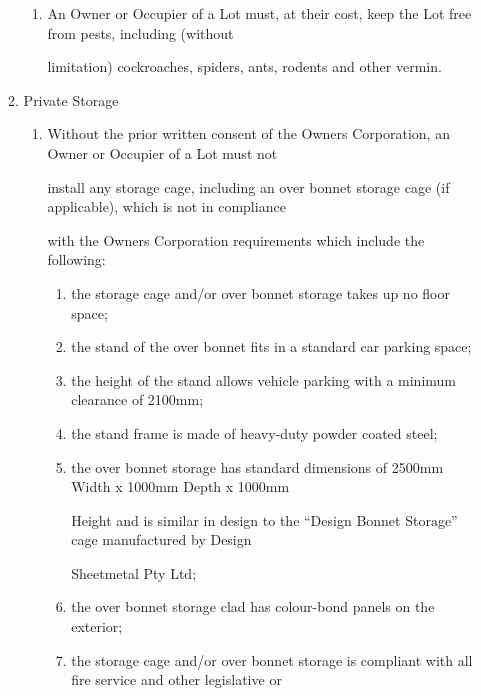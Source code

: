 \documentclass{article}
\begin{document}
\begin{enumerate}[label=\arabic*.]
\begin{enumerate}[label=\arabic{enumi}.\arabic*.]
\begin{enumerate}[label=(\arabic*)]
\item {\fontsize{9.962}{1} An Owner or Occupier of a Lot must, at their cost, keep the Lot free from pests, including (without }

{\fontsize{10.02}{1}limitation) cockroaches, spiders, ants, rodents and other vermin. }

\end{enumerate}
\item {\fontsize{9.99}{1} Private Storage }

\begin{enumerate}[label=(\arabic*)]
\item {\fontsize{9.962}{1} Without the prior written consent of the Owners Corporation, an Owner or Occupier of a Lot must not }

{\fontsize{10.02}{1}install any storage cage, including an over bonnet storage cage (if applicable), which is not in compliance }

{\fontsize{10.02}{1}with the Owners Corporation requirements which include the following: }

\begin{enumerate}[label=(\alph*)]
\item {\fontsize{9.962}{1} the storage cage and/or over bonnet storage takes up no floor space; }

\item {\fontsize{9.962}{1} the stand of the over bonnet fits in a standard car parking space; }

\item {\fontsize{9.962}{1} the height of the stand allows vehicle parking with a minimum clearance of 2100mm; }

\item {\fontsize{9.962}{1} the stand frame is made of heavy-duty powder coated steel; }

\item {\fontsize{9.962}{1} the over bonnet storage has standard dimensions of 2500mm Width x 1000mm Depth x 1000mm }

{\fontsize{10.02}{1}Height and is similar in design to the “Design Bonnet Storage” cage manufactured by Design }

{\fontsize{10.02}{1}Sheetmetal Pty Ltd; }

\item {\fontsize{9.962}{1} the over bonnet storage clad has colour-bond panels on the exterior; }

\item {\fontsize{9.962}{1} the storage cage and/or over bonnet storage is compliant with all fire service and other legislative or }


\end{enumerate}
\end{enumerate}
\end{enumerate}
\end{enumerate}
\end{document}
